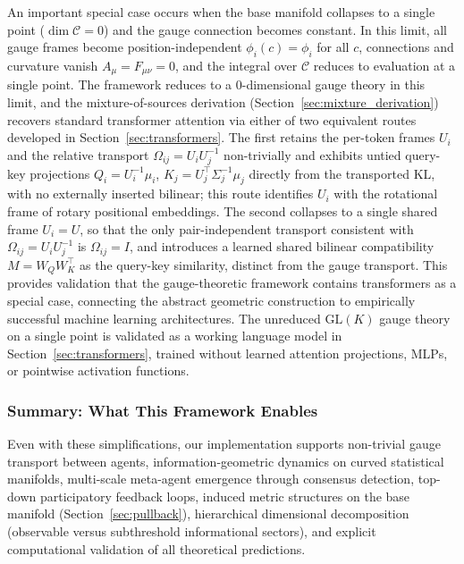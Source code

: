 \documentclass[11pt]{article}
\begin{document}
An important special case occurs when the base manifold collapses to a single point ($\dim\mathcal{C} = 0$) and the gauge connection becomes constant. In this limit, all gauge frames become position-independent $\phi_i(c) = \phi_i$ for all $c$, connections and curvature vanish $A_\mu = F_{\mu\nu} = 0$, and the integral over $\mathcal{C}$ reduces to evaluation at a single point. The framework reduces to a 0-dimensional gauge theory in this limit, and the mixture-of-sources derivation (Section~\ref{sec:mixture_derivation}) recovers standard transformer attention via either of two equivalent routes developed in Section~\ref{sec:transformers}. The first retains the per-token frames $U_i$ and the relative transport $\Omega_{ij} = U_iU_j^{-1}$ non-trivially and exhibits untied query-key projections $Q_i = U_i^{-1}\mu_i$, $K_j = U_j^\top\Sigma_j^{-1}\mu_j$ directly from the transported KL, with no externally inserted bilinear; this route identifies $U_i$ with the rotational frame of rotary positional embeddings. The second collapses to a single shared frame $U_i = U$, so that the only pair-independent transport consistent with $\Omega_{ij} = U_iU_j^{-1}$ is $\Omega_{ij} = I$, and introduces a learned shared bilinear compatibility $M = W_QW_K^\top$ as the query-key similarity, distinct from the gauge transport. This provides validation that the gauge-theoretic framework contains transformers as a special case, connecting the abstract geometric construction to empirically successful machine learning architectures. The unreduced $\mathrm{GL}(K)$ gauge theory on a single point is validated as a working language model in Section~\ref{sec:transformers}, trained without learned attention projections, MLPs, or pointwise activation functions.

\subsubsection{Summary: What This Framework Enables}

Even with these simplifications, our implementation supports non-trivial gauge transport between agents, information-geometric dynamics on curved statistical manifolds, multi-scale meta-agent emergence through consensus detection, top-down participatory feedback loops, induced metric structures on the base manifold (Section~\ref{sec:pullback}), hierarchical dimensional decomposition (observable versus subthreshold informational sectors), and explicit computational validation of all theoretical predictions.
\end{document}
